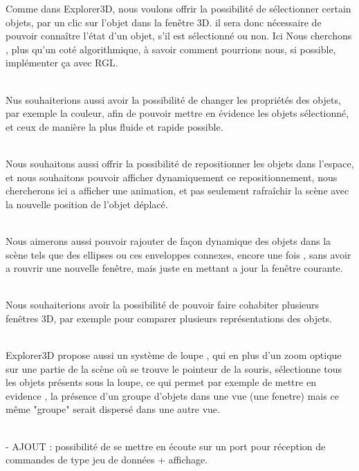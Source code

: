 Comme dans Explorer3D, nous voulons offrir la possibilité de sélectionner certain objets, par un clic sur l'objet dans la fenêtre 3D. il sera donc nécessaire de pouvoir connaître l'état d'un objet, s’il est sélectionné ou non. Ici Nous cherchons , plus qu'un coté algorithmique, à savoir comment pourrions nous, si possible, implémenter ça avec RGL. 
\\\\\indent

Nus souhaiterions aussi avoir la possibilité de changer les propriétés des objets, par exemple la couleur, afin de pouvoir mettre en évidence les objets sélectionné, et ceux de manière la plus fluide et rapide possible.
\\\\\indent

Nous souhaitons aussi offrir la possibilité de repositionner les objets dans l'espace, et nous souhaitons pouvoir afficher dynamiquement ce repositionnement, nous chercherons ici a afficher une animation, et pas seulement rafraîchir la scène avec la nouvelle position de l'objet déplacé. 
\\\\\indent

Nous aimerons aussi pouvoir rajouter de façon dynamique des objets dans la scène tels que des ellipses ou ces enveloppes connexes, encore une fois , sans avoir a rouvrir une nouvelle fenêtre, mais juste en mettant a jour la fenêtre courante.
\\\\\indent

Nous souhaiterions avoir la possibilité de pouvoir faire cohabiter plusieurs fenêtres 3D,  par exemple pour comparer plusieurs représentations des objets.
\\\\\indent

Explorer3D propose aussi un système de loupe , qui en plus d'un zoom optique sur une partie de la scène où se trouve le pointeur de la souris, sélectionne tous les objets présents sous la loupe, ce qui permet par exemple de mettre en evidence , la présence d'un groupe d'objets dans une vue (une fenetre) mais ce même "groupe" serait dispersé dans une autre vue.
\\\\\indent


- AJOUT : possibilité de se mettre en écoute sur un port pour réception de commandes de type jeu de données + affichage.

\newpage